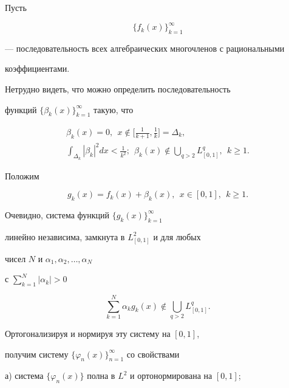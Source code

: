 \begin{pf}


Пусть


\begin{equation}


\{ f_k(x) \}_{k=1}^\infty


\end{equation}


--- последовательность всех алгебраических многочленов с рациональными 


коэффициентами.


Нетрудно видеть, что можно определить последовательность 


функций $\{ \beta_k(x) \}_{k=1}^\infty$ такую, что


\begin{gather*}


\beta_k(x)=0,\ \ x \notin \bigg[ \frac{1}{k+1},\frac{1}{k} \bigg]=


\Delta_k, \\


\int_{\Delta_k}|\beta_k|^2 dx< \frac{1}{k^2};


\ \ \beta_k(x)\notin \bigcup_{q>2} L^q_{[0,1]},\ \ k\geq 1.


\end{gather*}


Положим


$$


g_k(x)=f_k(x)+\beta_k(x),\ \ x\in [0,1],\ \ k\geq 1.


$$


Очевидно, система функций $\{ g_k(x) \}_{k=1}^\infty$


линейно независима, замкнута в $L^2_{[0,1]}$ и для любых


чисел $N$ и $\alpha_1,\alpha_2,\dotsc,\alpha_N$


с $\sum\limits_{k=1}^N |\alpha_k|>0$


$$


\sum_{k=1}^N \alpha_k g_k(x)\notin \bigcup_{q>2} L^q_{[0,1]}.


$$


Ортогонализируя и нормируя эту систему на $[0,1]$,


получим систему $\{\varphi_n(x)\}_{n=1}^\infty$ со свойствами





а) система $\{\varphi_n(x)\}$ полна в $L^2$ и ортонормирована на $[0,1]$;






\end{pf}
